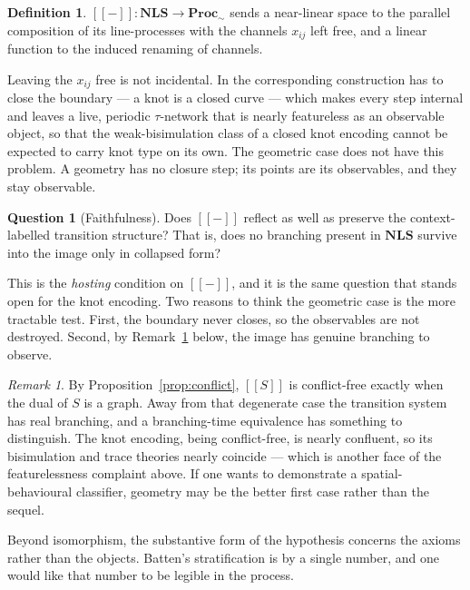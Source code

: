 \documentclass[11pt]{article}
\theoremstyle{plain}
\theoremstyle{definition}
\newtheorem{definition}[theorem]{Definition}
\newtheorem{question}[theorem]{Question}
\theoremstyle{remark}
\newtheorem{remark}[theorem]{Remark}
\newcommand{\enc}[1]{[\![#1]\!]}
\newcommand{\Proc}{\mathbf{Proc}}
\newcommand{\NLS}{\mathbf{NLS}}
\begin{document}
\begin{definition}
$\enc{-} : \NLS \to \Proc_{\sim}$ sends a near-linear space to the parallel composition of
its line-processes with the channels $x_{ij}$ left free, and a linear function to the
induced renaming of channels.
\end{definition}

Leaving the $x_{ij}$ free is not incidental. In \cite[\S10]{KnotsNote} the corresponding
construction has to close the boundary --- a knot is a closed curve --- which makes every
step internal and leaves a live, periodic $\tau$-network that is nearly featureless as an
observable object, so that the weak-bisimulation class of a closed knot encoding cannot be
expected to carry knot type on its own. The geometric case does not have this problem. A
geometry has no closure step; its points are its observables, and they stay observable.

\begin{question}[Faithfulness]
\label{q:faithful}
Does $\enc{-}$ reflect as well as preserve the context-labelled transition structure? That
is, does no branching present in $\NLS$ survive into the image only in collapsed form?
\end{question}

This is the \emph{hosting} condition on $\enc{-}$, and it is the same question that stands
open for the knot encoding. Two reasons to think the geometric case is the more tractable
test. First, the boundary never closes, so the observables are not destroyed. Second, by
Remark~\ref{rem:branching} below, the image has genuine branching to observe.

\begin{remark}
\label{rem:branching}
By Proposition~\ref{prop:conflict}, $\enc{S}$ is conflict-free exactly when the dual of $S$
is a graph. Away from that degenerate case the transition system has real branching, and a
branching-time equivalence has something to distinguish. The knot encoding, being
conflict-free, is nearly confluent, so its bisimulation and trace theories nearly coincide
--- which is another face of the featurelessness complaint above. If one wants to
demonstrate a spatial-behavioural classifier, geometry may be the better first case
rather than the sequel.
\end{remark}

Beyond isomorphism, the substantive form of the hypothesis concerns the axioms rather than
the objects. Batten's stratification is by a single number, and one would like that number
to be legible in the process.
\end{document}
